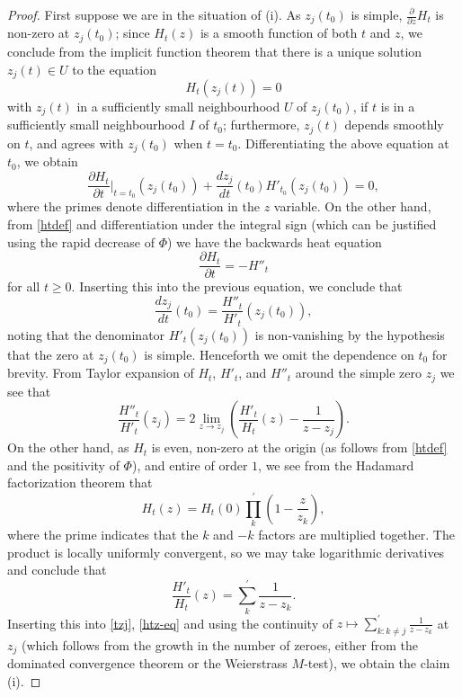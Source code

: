 \documentclass[a4paper,11pt,twoside]{amsart}
\begin{document}
\begin{proof}  First suppose we are in the situation of (i).  As $z_j(t_0)$ is simple, $\frac{\partial}{\partial z} H_t$ is non-zero at $z_j(t_0)$; since $H_t(z)$ is a smooth function of both $t$ and $z$, we conclude from the implicit function theorem that there is a unique solution $z_j(t) \in U$ to the equation
$$ H_t( z_j(t) ) = 0$$
with $z_j(t)$ in a sufficiently small neighbourhood $U$ of $z_j(t_0)$, if $t$ is in a sufficiently small neighbourhood $I$ of $t_0$; furthermore, $z_j(t)$ depends smoothly on $t$, and agrees with $z_j(t_0)$ when $t=t_0$.  Differentiating the above equation at $t_0$, we obtain
$$ \frac{\partial H_t}{\partial t}|_{t=t_0}( z_j(t_0) ) + \frac{d z_j}{d t}(t_0) H'_{t_0}(z_j(t_0)) = 0,$$
where the primes denote differentiation in the $z$ variable.
On the other hand, from \eqref{htdef} and differentiation under the integral sign (which can be justified using the rapid decrease of $\Phi$) we have the backwards heat equation
\begin{equation}\label{back}
\frac{\partial H_t}{\partial t} = -H''_t
\end{equation}
for all $t \geq 0$.  Inserting this into the previous equation, we conclude that
\begin{equation}\label{tzj}
\frac{d z_j}{d t}(t_0)  = \frac{H''_t}{H'_t}( z_j(t_0) ),
\end{equation}
noting that the denominator $H'_t(z_j(t_0))$ is non-vanishing by the hypothesis that the zero at $z_j(t_0)$ is simple.  Henceforth we omit the dependence on $t_0$ for brevity.  From Taylor expansion of $H_t$, $H'_t$, and $H''_t$ around the simple zero $z_j$ we see that
\begin{equation}\label{htz-eq}
 \frac{H''_t}{H'_t}( z_j) = 2 \lim_{z \to z_j}\left(  \frac{H'_t}{H_t}( z) - \frac{1}{z-z_j} \right).
\end{equation}
On the other hand, as $H_t$ is even, non-zero at the origin (as follows from \eqref{htdef} and the positivity of $\Phi$), and entire of order $1$, we see from the Hadamard factorization theorem that
$$ H_t(z) = H_t(0) \prod_k^{\prime} \left(1 - \frac{z}{z_k}\right),$$
where the prime indicates that the $k$ and $-k$ factors are multiplied together.  The product is locally uniformly convergent, so we may take logarithmic derivatives and conclude that
$$ \frac{H'_t}{H_t}(z) = \sum_k^{\prime} \frac{1}{z-z_k}.$$
Inserting this into \eqref{tzj}, \eqref{htz-eq} and using the continuity of $z \mapsto \sum_{k: k \neq j}^\prime \frac{1}{z-z_k}$ at $z_j$ (which follows from the growth in the number of zeroes, either from the dominated convergence theorem or the Weierstrass $M$-test), we obtain the claim (i).


\end{proof}
\end{document}
